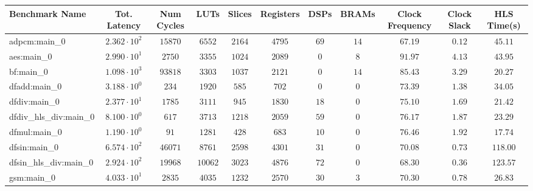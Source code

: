 \begin{tabular}{|l|c|c|c|c|c|c|c|c|c|c|}
\hline
Benchmark Name          & Tot. Latency           & Num Cycles & LUTs      & Slices    & Registers & DSPs    & BRAMs   & Clock Frequency & Clock Slack & HLS Time(s) \\
\hline
adpcm:main\_0           & $ 2.362 \cdot 10^{2} $ & $ 15870  $ & $ 6552  $ & $ 2164  $ & $ 4795  $ & $ 69  $ & $ 14  $ & $ 67.19       $ & $ 0.12    $ & $ 45.11   $ \\
aes:main\_0             & $ 2.990 \cdot 10^{1} $ & $ 2750   $ & $ 3355  $ & $ 1024  $ & $ 2089  $ & $ 0   $ & $ 8   $ & $ 91.97       $ & $ 4.13    $ & $ 43.95   $ \\
bf:main\_0              & $ 1.098 \cdot 10^{3} $ & $ 93818  $ & $ 3303  $ & $ 1037  $ & $ 2121  $ & $ 0   $ & $ 14  $ & $ 85.43       $ & $ 3.29    $ & $ 20.27   $ \\
dfadd:main\_0           & $ 3.188 \cdot 10^{0} $ & $ 234    $ & $ 1920  $ & $ 585   $ & $ 702   $ & $ 0   $ & $ 0   $ & $ 73.39       $ & $ 1.38    $ & $ 34.05   $ \\
dfdiv:main\_0           & $ 2.377 \cdot 10^{1} $ & $ 1785   $ & $ 3111  $ & $ 945   $ & $ 1830  $ & $ 18  $ & $ 0   $ & $ 75.10       $ & $ 1.69    $ & $ 21.42   $ \\
dfdiv\_hls\_div:main\_0 & $ 8.100 \cdot 10^{0} $ & $ 617    $ & $ 3713  $ & $ 1218  $ & $ 2059  $ & $ 59  $ & $ 0   $ & $ 76.17       $ & $ 1.87    $ & $ 23.29   $ \\
dfmul:main\_0           & $ 1.190 \cdot 10^{0} $ & $ 91     $ & $ 1281  $ & $ 428   $ & $ 683   $ & $ 10  $ & $ 0   $ & $ 76.46       $ & $ 1.92    $ & $ 17.74   $ \\
dfsin:main\_0           & $ 6.574 \cdot 10^{2} $ & $ 46071  $ & $ 8761  $ & $ 2598  $ & $ 4301  $ & $ 31  $ & $ 0   $ & $ 70.08       $ & $ 0.73    $ & $ 118.00  $ \\
dfsin\_hls\_div:main\_0 & $ 2.924 \cdot 10^{2} $ & $ 19968  $ & $ 10062 $ & $ 3023  $ & $ 4876  $ & $ 72  $ & $ 0   $ & $ 68.30       $ & $ 0.36    $ & $ 123.57  $ \\
gsm:main\_0             & $ 4.033 \cdot 10^{1} $ & $ 2835   $ & $ 4035  $ & $ 1232  $ & $ 2570  $ & $ 30  $ & $ 3   $ & $ 70.30       $ & $ 0.78    $ & $ 26.83   $ \\

\end{tabular}
